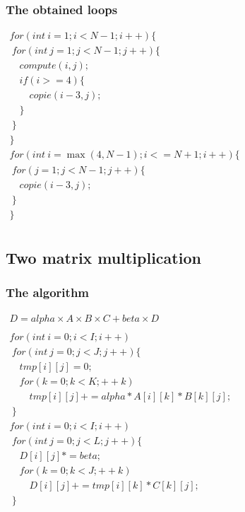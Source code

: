 \documentclass{beamer}
\begin{document}

\begin{frame}
\frametitle{The obtained loops}

{$\begin{array}{l}
for(int~i=1; i<N-1; i++)\{ \\
~for(int~j=1; j<N-1; j++)\{ \\
\quad{}compute(i,j); \\
\quad{}if(i>=4)\{ \\
\qquad{}copie(i-3,j); \\
\quad{}\} \\
~\} \\
\} \\
for(int~i=\max(4, N-1); i<=N+1; i++)\{ \\
~for(j=1; j<N-1; j++)\{ \\
\quad{}copie(i-3,j); \\
~\} \\
\} \\
\end{array}$
}

\end{frame}


\subsection{Two matrix multiplication}

\begin{frame}
\frametitle{The algorithm}

{$\begin{array}{l}
D= alpha\times{}A\times{}B\times{}C + beta\times{}D \\ \\
for (int~i = 0; i < I; i++) \\
~for (int~j = 0; j < J; j++)\{ \\
\quad{}tmp[i][j] = 0; \\
\quad{}for (k = 0; k < K; ++k) \\
\qquad{}tmp[i][j] += alpha * A[i][k] * B[k][j]; \\
~\} \\
for (int~i = 0; i < I; i++) \\
~for (int~j = 0; j < L; j++)\{ \\
\quad{}D[i][j] *= beta; \\
\quad{}for (k = 0; k < J; ++k) \\
\qquad{}D[i][j] += tmp[i][k] * C[k][j]; \\
~\}

\end{array}$
}
\end{frame}
\end{document}
